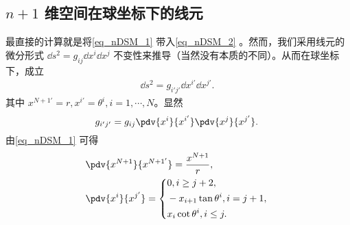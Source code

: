 \subsection{$n+1$ 维空间在球坐标下的线元}
最直接的计算就是将\autoref{eq_nDSM_1} 带入\autoref{eq_nDSM_2} 。然而，我们采用线元的微分形式 $\dd s^2=g_{ij}\dd x^i\dd x^j$ 不变性来推导（当然没有本质的不同）。从而在球坐标下，成立
\begin{equation}
\begin{aligned}
\dd s^2= g_{i'j'}\dd x^{i'}\dd x^{j'}.
\end{aligned}~
\end{equation}
其中 $x^{N+1'}=r,x^{i'}=\theta^i,i=1,\cdots,N$。显然
\begin{equation}
g_{i'j'}=g_{ij}\pdv{x^i}{x^{i'}}\pdv{x^j}{x^{j'}}.~
\end{equation}
由\autoref{eq_nDSM_1} 可得
\begin{equation}
\begin{aligned}
&\pdv{x^{N+1}}{x^{N+1'}}=\frac{x^{N+1}}{r},\\
&\pdv{x^{i}}{x^{j'}}=\left\{\begin{aligned}
&0,i\geq j+2,\\
&-x_{i+1}\tan\theta^i,i=j+1,\\
&x_i\cot\theta^i,i\leq j.
\end{aligned}\right.
\end{aligned}~
\end{equation}



























